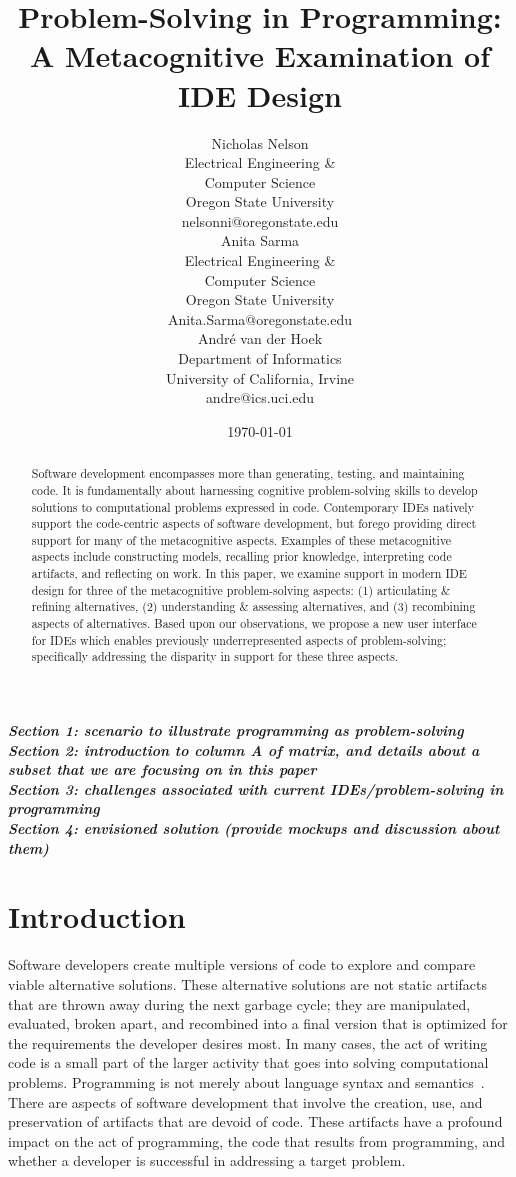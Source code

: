 \documentclass{ppig}
\title{Problem-Solving in Programming: A Metacognitive Examination of IDE Design}
\author{Nicholas Nelson \\
  Electrical Engineering \&\\ Computer Science \\
  Oregon State University \\
  nelsonni@oregonstate.edu \\
  \And
  Anita Sarma \\
  Electrical Engineering \&\\ Computer Science \\
  Oregon State University \\
  Anita.Sarma@oregonstate.edu \\
  \And
  André van der Hoek \\
  Department of Informatics \\
  University of California, Irvine \\
  andre@ics.uci.edu
}
\date{\today}
\newcommand{\bold}[1]{\textit{\textbf{\color{aoblue}#1}}}
\begin{document}
\maketitle
\thispagestyle{empty}

\begin{abstract}

Software development encompasses more than generating, testing, and maintaining code.
It is fundamentally about harnessing cognitive problem-solving skills to develop solutions to computational problems expressed in code.
Contemporary IDEs natively support the code-centric aspects of software development, but forego providing direct support for many of the metacognitive aspects.
Examples of these metacognitive aspects include constructing models, recalling prior knowledge, interpreting code artifacts, and reflecting on work.
In this paper, we examine support in modern IDE design for three of the metacognitive problem-solving aspects: (1) articulating \& refining alternatives, (2) understanding \& assessing alternatives, and (3) recombining aspects of alternatives.
Based upon our observations, we propose a new user interface for IDEs which enables previously underrepresented aspects of problem-solving; specifically addressing the disparity in support for these three aspects. 
\end{abstract}

\bold{Section 1: scenario to illustrate programming as problem-solving\\
Section 2: introduction to column A of matrix, and details about a subset that we are focusing on in this paper\\
Section 3: challenges associated with current IDEs/problem-solving in programming\\
Section 4: envisioned solution (provide mockups and discussion about them)}

\section{Introduction}
Software developers create multiple versions of code to explore and compare viable alternative solutions.
These alternative solutions are not static artifacts that are thrown away during the next garbage cycle; they are manipulated, evaluated, broken apart, and recombined into a final version that is optimized for the requirements the developer desires most.
In many cases, the act of writing code is a small part of the larger activity that goes into solving computational problems.
Programming is not merely about language syntax and semantics~\cite{loksa2016programming}.
There are aspects of software development that involve the creation, use, and preservation of artifacts that are devoid of code.
These artifacts have a profound impact on the act of programming, the code that results from programming, and whether a developer is successful in addressing a target problem.
\end{document}
